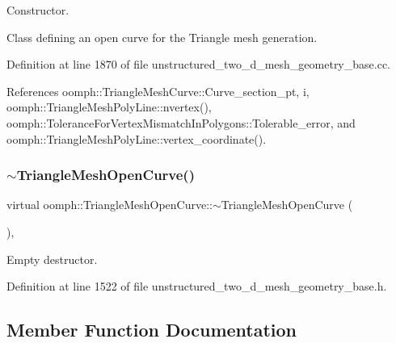 Constructor. 

Class defining an open curve for the Triangle mesh generation. 

Definition at line 1870 of file unstructured\+\_\+two\+\_\+d\+\_\+mesh\+\_\+geometry\+\_\+base.\+cc.



References oomph\+::\+Triangle\+Mesh\+Curve\+::\+Curve\+\_\+section\+\_\+pt, i, oomph\+::\+Triangle\+Mesh\+Poly\+Line\+::nvertex(), oomph\+::\+Tolerance\+For\+Vertex\+Mismatch\+In\+Polygons\+::\+Tolerable\+\_\+error, and oomph\+::\+Triangle\+Mesh\+Poly\+Line\+::vertex\+\_\+coordinate().

\mbox{\label{classoomph_1_1TriangleMeshOpenCurve_a70a3975f694fcf8bc7c2187ee40da177}} 
\subsubsection{\texorpdfstring{$\sim$\+Triangle\+Mesh\+Open\+Curve()}{~TriangleMeshOpenCurve()}}
{\footnotesize\ttfamily virtual oomph\+::\+Triangle\+Mesh\+Open\+Curve\+::$\sim$\+Triangle\+Mesh\+Open\+Curve (\begin{DoxyParamCaption}{ }\end{DoxyParamCaption})\hspace{0.3cm}{\ttfamily [inline]}, {\ttfamily [virtual]}}



Empty destructor. 



Definition at line 1522 of file unstructured\+\_\+two\+\_\+d\+\_\+mesh\+\_\+geometry\+\_\+base.\+h.



\subsection{Member Function Documentation}
\mbox{\label{classoomph_1_1TriangleMeshOpenCurve_a639fc3a8b9860c98abc7c2d09f6917d8}} 
